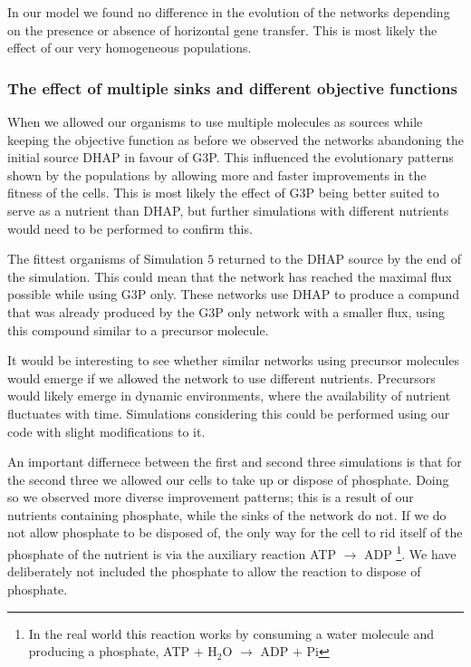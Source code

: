 \documentclass[a4paper,12pt]{article}
\begin{document}
In our model we found no difference in the evolution of the networks depending on the presence or absence of horizontal gene transfer. This is most likely the effect of our very homogeneous populations. 

\subsubsection*{The effect of multiple sinks and different objective functions}
\label{sub:the_effect_of_multiple_sinks}

When we allowed our organisms to use multiple molecules as sources while keeping the objective function as before we observed the networks abandoning the initial source DHAP in favour of G3P. This influenced the evolutionary patterns shown by the populations by allowing more and faster improvements in the fitness of the cells. This is most likely the effect of G3P being better suited to serve as a nutrient than DHAP, but further simulations with different nutrients would need to be performed to confirm this.

The fittest organisms of Simulation $5$ returned to the DHAP source by the end of the simulation. This could mean that the network has reached the maximal flux possible while using G3P only. These networks use DHAP to produce a compund that was already produced by the G3P only network with a smaller flux, using this compound similar to a precursor molecule. 

It would be interesting to see whether similar networks using precursor molecules would emerge if we allowed the network to use different nutrients. Precursors would likely emerge in dynamic environments, where the availability of nutrient fluctuates with time. Simulations considering this could be performed using our code with slight modifications to it. 

An important differnece between the first and second three simulations is that for the second three we allowed our cells to take up or dispose of phosphate. Doing so we observed more diverse improvement patterns; this is a result of our nutrients containing phosphate, while the sinks of the network do not. If we do not allow phosphate to be disposed of, the only way for the cell to rid itself of the phosphate of the nutrient is via the auxiliary reaction ATP $\rightarrow$ ADP \footnote{In the real world this reaction works by consuming a water molecule and producing a phosphate, ATP $+$ H$_2$O $\rightarrow$ ADP $+$ Pi}. We have deliberately not included the phosphate to allow the reaction to dispose of phosphate. 
\end{document}
